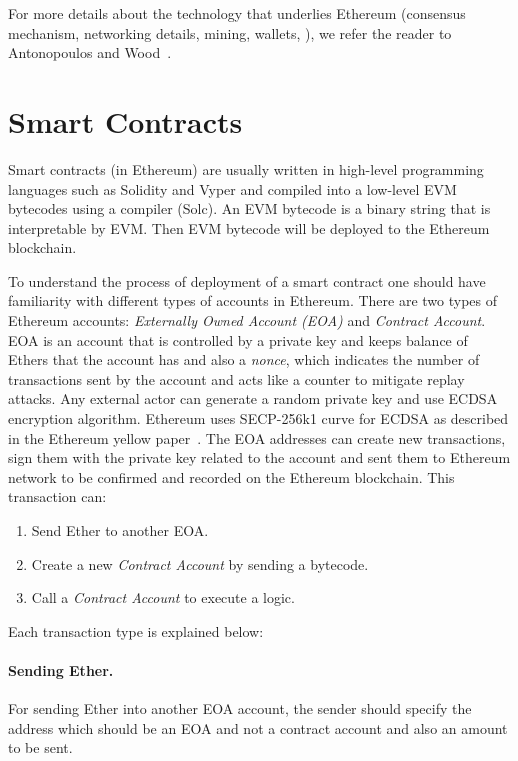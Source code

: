For more details about the technology that underlies Ethereum (\eg consensus mechanism, networking details, mining, wallets, \etc), we refer the reader to Antonopoulos and Wood~\cite{antonopoulos2018mastering}.

\section{Smart Contracts}

Smart contracts (in Ethereum) are usually written in high-level programming languages such as Solidity and Vyper and compiled into a low-level EVM bytecodes using a compiler (\eg Solc). An EVM bytecode is a binary string that is interpretable by EVM. Then EVM bytecode will be deployed to the Ethereum blockchain.

To understand the process of deployment of a smart contract one should have familiarity with different types of accounts in Ethereum. There are two types of Ethereum accounts: \textit{Externally Owned Account (EOA)} and \textit{Contract Account}. 
EOA is an account that is controlled by a private key and keeps balance of Ethers that the account has and also a \textit{nonce}, which indicates the number of transactions sent by the account and acts like a counter to mitigate replay attacks. Any external actor can generate a random private key and use ECDSA encryption algorithm. Ethereum uses SECP-256k1 curve for ECDSA as described in the Ethereum yellow paper~\cite{wood2014ethereum}.
The EOA addresses can create new transactions, sign them with the private key related to the account and sent them to Ethereum network to be confirmed and recorded on the Ethereum blockchain. This transaction can:
\begin{enumerate}
    \item Send Ether to another EOA.
    \item Create a new \textit{Contract Account} by sending a bytecode.
    \item Call a \textit{Contract Account} to execute a logic.
\end{enumerate}

Each transaction type is explained below:

\paragraph{Sending Ether.} 
For sending Ether into another EOA account, the sender should specify the address which should be an EOA and not a contract account and also an amount to be sent.

